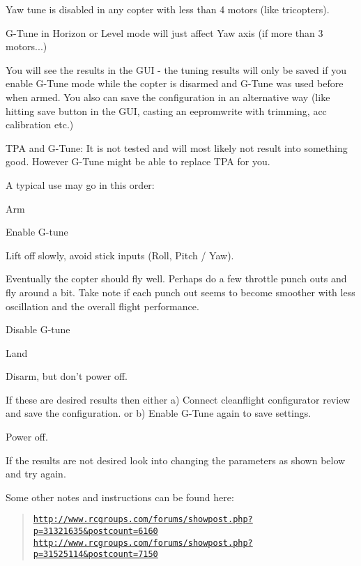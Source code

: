 Yaw tune is disabled in any copter with less than 4 motors (like tricopters).

G-\/\+Tune in Horizon or Level mode will just affect Yaw axis (if more than 3 motors...)

You will see the results in the G\+U\+I -\/ the tuning results will only be saved if you enable G-\/\+Tune mode while the copter is disarmed and G-\/\+Tune was used before when armed. You also can save the configuration in an alternative way (like hitting save button in the G\+U\+I, casting an eepromwrite with trimming, acc calibration etc.)

T\+P\+A and G-\/\+Tune\+: It is not tested and will most likely not result into something good. However G-\/\+Tune might be able to replace T\+P\+A for you.

A typical use may go in this order\+:


\begin{DoxyEnumerate}
\item Arm
\item Enable G-\/tune
\item Lift off slowly, avoid stick inputs (Roll, Pitch / Yaw).
\item Eventually the copter should fly well. Perhaps do a few throttle punch outs and fly around a bit. Take note if each punch out seems to become smoother with less oscillation and the overall flight performance.
\item Disable G-\/tune
\item Land
\item Disarm, but don’t power off.
\item If these are desired results then either a) Connect cleanflight configurator review and save the configuration. or b) Enable G-\/\+Tune again to save settings.
\item Power off.
\end{DoxyEnumerate}

If the results are not desired look into changing the parameters as shown below and try again.

Some other notes and instructions can be found here\+:

\begin{quote}
\href{http://www.rcgroups.com/forums/showpost.php?p=31321635&postcount=6160}{\tt http\+://www.\+rcgroups.\+com/forums/showpost.\+php?p=31321635\&postcount=6160} \href{http://www.rcgroups.com/forums/showpost.php?p=31525114&postcount=7150}{\tt http\+://www.\+rcgroups.\+com/forums/showpost.\+php?p=31525114\&postcount=7150} \end{quote}


